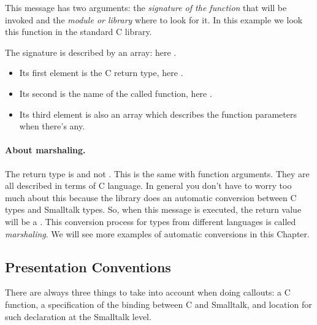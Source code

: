 \documentclass[a4paper,10pt,twoside]{book}
\begin{document}
This message has two arguments: the \emph{signature of the function} that will be invoked and the \emph{module or library} where to look for it.  In this example we look this function in the standard C library. 

The signature is described by an array: here .
\begin{itemize} 
\item Its first element is the C return type, here .
\item Its second is the name of the called function, here .
\item Its third element is also an array which describes the function parameters when there's any. 
\end{itemize}

\paragraph{About marshaling.} The return type is  and not . This is the same with function arguments. They are all described in terms of C language. In general you don't have to worry too much about this because the \Spock library does an automatic conversion between C types and Smalltalk types. So, when this message is executed, the return value will be a . 
This conversion process for types from different languages is called \emph{marshaling}.
We will see more examples of automatic conversions in this Chapter. 

\subsection{Presentation Conventions}

There are always three things to take into account when doing callouts:  a C function, a specification of the binding between C and Smalltalk, and location for such declaration at the Smalltalk level. 
\end{document}
